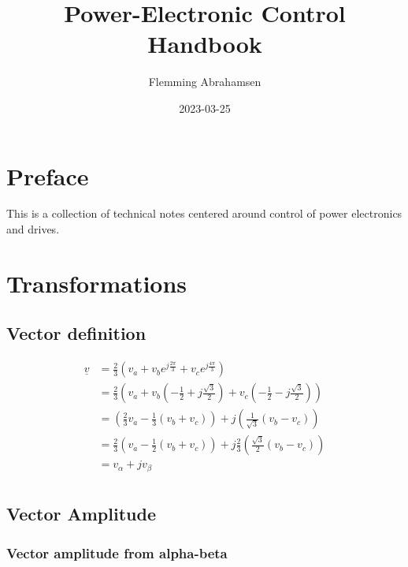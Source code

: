 \documentclass[]{book}
\title{Power-Electronic Control Handbook}
\author{Flemming Abrahamsen}
\date{2023-03-25}
\begin{document}
\maketitle

{
\setcounter{tocdepth}{1}
\tableofcontents
}
\hypertarget{preface}{%
\chapter{Preface}\label{preface}}

This is a collection of technical notes centered around control of power electronics and drives.

\hypertarget{transformations}{%
\chapter{Transformations}\label{transformations}}

\hypertarget{vector-definition}{%
\section{Vector definition}\label{vector-definition}}

\[
\begin{aligned}
\underline{v} 
& = \frac{2}{3} \left( v_a + v_b e^{j \frac{2 \pi}{3}}+ v_c e^{j \frac{4 \pi}{3}} \right)\\
& = \frac{2}{3} \left( v_a + v_b (- \frac{1}{2}+j\frac{\sqrt{3}}{2}) + v_c (- \frac{1}{2}-j\frac{\sqrt{3}}{2}) \right)\\
& = \left(\frac{2}{3} v_a - \frac{1}{3}  (v_b+v_c) \right) + j \left( \frac{1}{\sqrt{3}} (v_b-v_c) \right)   \\
& = \frac{2}{3} \left( v_a - \frac{1}{2}  (v_b+v_c) \right) + j \frac{2}{3} \left( \frac{\sqrt{3}}{2} (v_b-v_c) \right)   \\
& = v_\alpha + j v_\beta   \\
\end{aligned}
\label{eq:trans1}
\]

\hypertarget{vector-amplitude}{%
\section{Vector Amplitude}\label{vector-amplitude}}

\hypertarget{vector-amplitude-from-alpha-beta}{%
\subsection{Vector amplitude from alpha-beta}\label{vector-amplitude-from-alpha-beta}}
\end{document}
